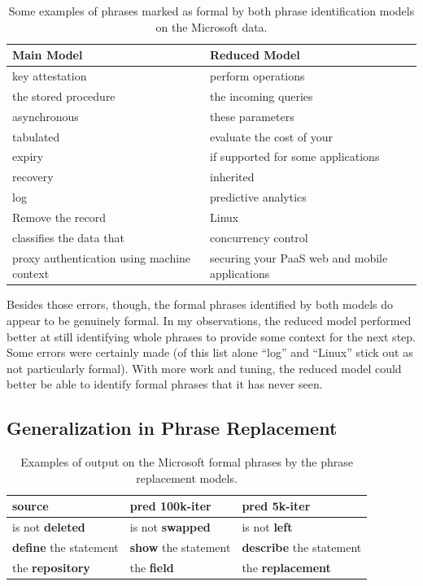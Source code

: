 \begin{table}[h]
\centering
 \begin{tabular}{|| p{5cm} | p{5cm} ||} 
 \hline
 Main Model & Reduced Model \\ [0.3ex] 
 \hline\hline
 key attestation & perform operations \\ 
 \hline
 the stored procedure & the incoming queries \\ 
 \hline
 asynchronous & these parameters \\ 
 \hline
 tabulated & evaluate the cost of your \\ 
 \hline
 expiry & if supported for some applications \\ 
 \hline
 recovery & inherited \\ 
 \hline
 log & predictive analytics \\ 
 \hline
 Remove the record & Linux \\ 
 \hline
 classifies the data that & concurrency control \\ 
 \hline
 proxy authentication using machine context & securing your PaaS web and mobile applications \\ 
 \hline
\end{tabular}
\caption{Some examples of phrases marked as formal by both phrase identification models on the Microsoft data.}
\label{phrase-ident-mic-examples}
\end{table}

Besides those errors, though, the formal phrases identified by both models do appear to be genuinely formal. In my observations, the reduced model performed better at still identifying whole phrases to provide some context for the next step. Some errors were certainly made (of this list alone ``log'' and ``Linux'' stick out as not particularly formal). With more work and tuning, the reduced model could better be able to identify formal phrases that it has never seen.

\subsection{Generalization in Phrase Replacement}

\begin{table}[h]
\centering
 \begin{tabular}{|| p{4cm} | p{4cm} | p{4cm} ||}
 \hline
 source & pred 100k-iter & pred 5k-iter \\ [0.3ex] 
 \hline\hline
 is not \textbf{deleted} & 
 is not \textbf{swapped} & 
 is not \textbf{left} \\
 \hline
 \textbf{define} the statement & 
 \textbf{show} the statement & 
 \textbf{describe} the statement \\
 \hline
 the \textbf{repository} & 
 the \textbf{field} & 
 the \textbf{replacement} \\
 \hline
\end{tabular}
\caption{Examples of output on the Microsoft formal phrases by the phrase replacement models.}
\label{general-phrase-repl}
\end{table}

